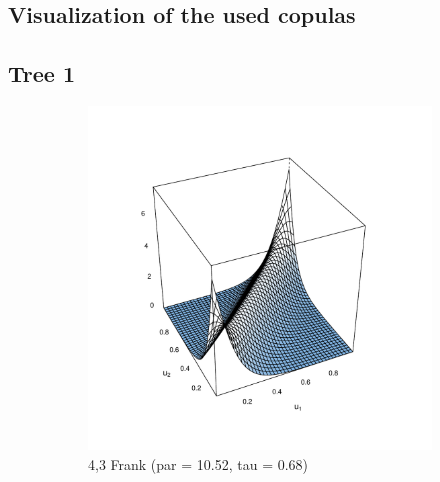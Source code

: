 \documentclass{article}
\begin{document}
\clearpage
\begin{samepage}
  \section{Visualization of the used copulas}
  \label{sec:copulas}
  \subsection{Tree 1}
  \begin{figure}[h]
    \begin{subfigure}[b]{0.475\textwidth}
      \centering
      \includegraphics[width=\textwidth]{1}
      \caption[]%
      {{\small 4,3 Frank (par = 10.52, tau = 0.68)}}
      \label{fig:a}
    \end{subfigure}%
    \hfill
    \begin{subfigure}[b]{0.475\textwidth}
      \centering

\end{subfigure}
\end{figure}
\end{samepage}
\end{document}
